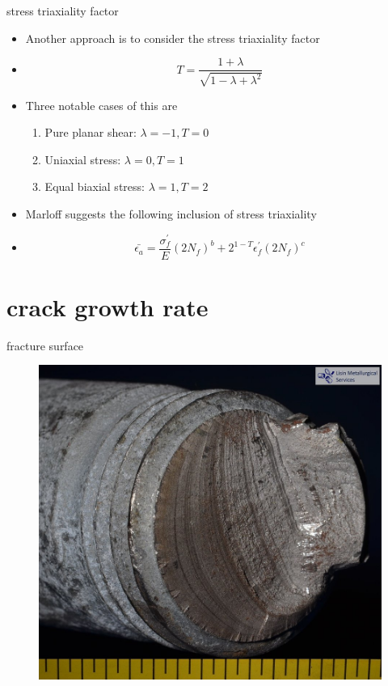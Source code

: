 \documentclass[10pt]{beamer}
\begin{document}
\begin{frame}{stress triaxiality factor}
	\begin{itemize}[<+->]
		\item Another approach is to consider the stress triaxiality factor
		\item[] \begin{equation}
		T = \frac{1+\lambda}{\sqrt{1-\lambda+\lambda^2}}
		\end{equation}
		\item Three notable cases of this are
		\begin{enumerate}
			\item Pure planar shear: $\lambda=-1, T=0$
			\item Uniaxial stress: $\lambda=0, T=1$
			\item Equal biaxial stress: $\lambda=1, T=2$
		\end{enumerate}
		\item Marloff suggests the following inclusion of stress triaxiality
		\item[] \begin{equation}
		\bar{\epsilon_a} = \frac{\sigma_f^\prime}{E}(2 N_f)^b + 2^{1-T}\epsilon_f^\prime(2N_f)^c
		\end{equation}
	\end{itemize}
\end{frame}

\section{crack growth rate}

\begin{frame}{fracture surface}
	\begin{figure}
	\centering
	\includegraphics[width=0.7\linewidth]{../Figures/fracture_surface}
	\label{fig:fracture_surface}
	\end{figure}
\end{frame}
\end{document}
